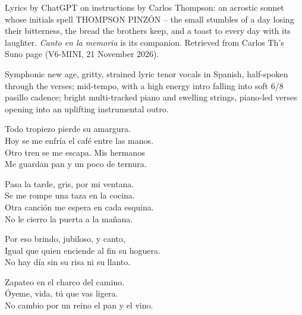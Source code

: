 
\begin{notes}
Lyrics by ChatGPT on instructions by Carlos Thompson: an acrostic sonnet whose initials spell THOMPSON PINZÓN -- the small stumbles of a day losing their bitterness, the bread the brothers keep, and a toast to every day with its laughter. \emph{Canto en la memoria} is its companion. Retrieved from Carlos Th's Suno page (V6-MINI, 21 November 2026).
\end{notes}
\begin{style}
Symphonic new age, gritty, strained lyric tenor vocals in Spanish, half-spoken through the verses; mid-tempo, with a high energy intro falling into soft 6/8 pasillo cadence; bright multi-tracked piano and swelling strings, piano-led verses opening into an uplifting instrumental outro.
\end{style}
\begin{lyrics}
Todo tropiezo pierde su amargura.\\
Hoy se me enfría el café entre las manos.\\
Otro tren se me escapa. Mis hermanos\\
Me guardan pan y un poco de ternura.

Pasa la tarde, gris, por mi ventana.\\
Se me rompe una taza en la cocina.\\
Otra canción me espera en cada esquina.\\
No le cierro la puerta a la mañana.

Por eso brindo, jubiloso, y canto,\\
Igual que quien enciende al fin su hoguera.\\
No hay día sin su risa ni su llanto.

Zapateo en el charco del camino.\\
Óyeme, vida, tú que vas ligera.\\
No cambio por un reino el pan y el vino.
\end{lyrics}

